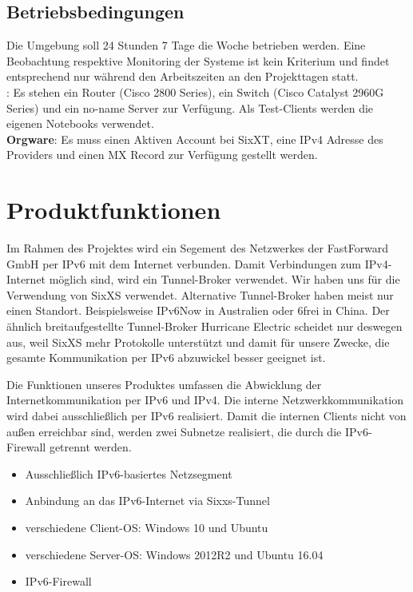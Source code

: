 \subsection{Betriebsbedingungen}

Die Umgebung soll 24 Stunden 7 Tage die Woche betrieben werden. Eine Beobachtung respektive Monitoring der Systeme ist kein Kriterium und findet entsprechend nur während den Arbeitszeiten an den Projekttagen statt.\\

: Es stehen ein Router (Cisco 2800 Series), ein Switch (Cisco Catalyst 2960G Series) und ein no-name Server zur Verfügung. Als Test-Clients werden die eigenen Notebooks verwendet.\\
{\bf Orgware}: Es muss einen Aktiven Account bei SixXT, eine IPv4 Adresse des Providers und einen MX Record zur Verfügung gestellt werden.
\section{Produktfunktionen}

Im Rahmen des Projektes wird ein Segement des Netzwerkes der FastForward GmbH per IPv6 mit dem Internet verbunden. Damit Verbindungen zum IPv4-Internet möglich sind, wird ein Tunnel-Broker verwendet. Wir haben uns für die Verwendung von SixXS verwendet. Alternative Tunnel-Broker haben meist nur einen Standort. Beispielsweise IPv6Now in Australien oder 6frei in China. Der ähnlich breitaufgestellte Tunnel-Broker Hurricane Electric scheidet nur deswegen aus, weil SixXS mehr Protokolle unterstützt und damit für unsere Zwecke, die gesamte Kommunikation per IPv6 abzuwickel besser geeignet ist.

Die Funktionen unseres Produktes umfassen die Abwicklung der Internetkommunikation per IPv6 und IPv4. Die interne Netzwerkkommunikation wird dabei ausschließlich per IPv6 realisiert. Damit die internen Clients nicht von außen erreichbar sind, werden zwei Subnetze realisiert, die durch die IPv6-Firewall getrennt werden.

\begin{itemize}
	\item Ausschließlich IPv6-basiertes Netzsegment
	\item Anbindung an das IPv6-Internet via Sixxs-Tunnel
	\item verschiedene Client-OS: Windows 10 und Ubuntu
	\item verschiedene Server-OS: Windows 2012R2 und Ubuntu 16.04
	\item IPv6-Firewall
\end{itemize}

